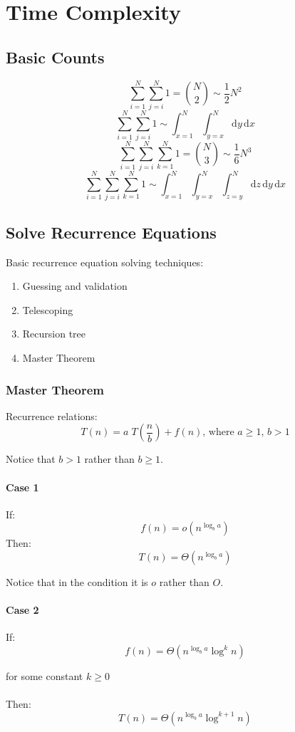 \chapter{Time Complexity}

\section{Basic Counts}
$$
\sum_{i=1}^N{\sum_{j=i}^N{1}} = {N \choose 2} \sim \frac{1}{2} N^2
$$
$$
\sum_{i=1}^N{\sum_{j=i}^N{1}} \sim \int_{x=1}^N \int_{y=x}^N  \mathrm{d}y\, \mathrm{d}x
$$
$$
\sum_{i=1}^N{\sum_{j=i}^N{\sum_{k=1}^N{1}}} = {N \choose 3} \sim \frac{1}{6} N^3
$$
$$
\sum_{i=1}^N{\sum_{j=i}^N{\sum_{k=1}^N{1}}} \sim \int_{x=1}^N \int_{y=x}^N \int_{z=y}^N \mathrm{d}z\,
\mathrm{d}y\, \mathrm{d}x
$$

\section{Solve Recurrence Equations}
Basic recurrence equation solving techniques:
\begin{enumerate}
\item Guessing and validation
\item Telescoping
\item Recursion tree
\item Master Theorem
\end{enumerate}

\subsection{Master Theorem}
Recurrence relations:
$$T(n) = a \; T\!\left(\frac{n}{b}\right) + f(n)\mbox{, where }a \geq 1 \mbox{, } b > 1$$

Notice that $b>1$ rather than $b\geq1$.

\subsubsection*{Case 1}
If:
$$f(n) = o(n^{\log_b a})$$
Then:
$$T(n) = \Theta(n^{\log_b a})$$

Notice that in the condition it is $o$ rather than $O$. 
\subsubsection*{Case 2}
If:
$$f(n) = \Theta(n^{\log_b a} \log^{k} n)$$

for some constant $k \geq 0$\\\\
Then:
$$
T(n) = \Theta(n^{\log_b a} \log^{k+1} n)
$$

